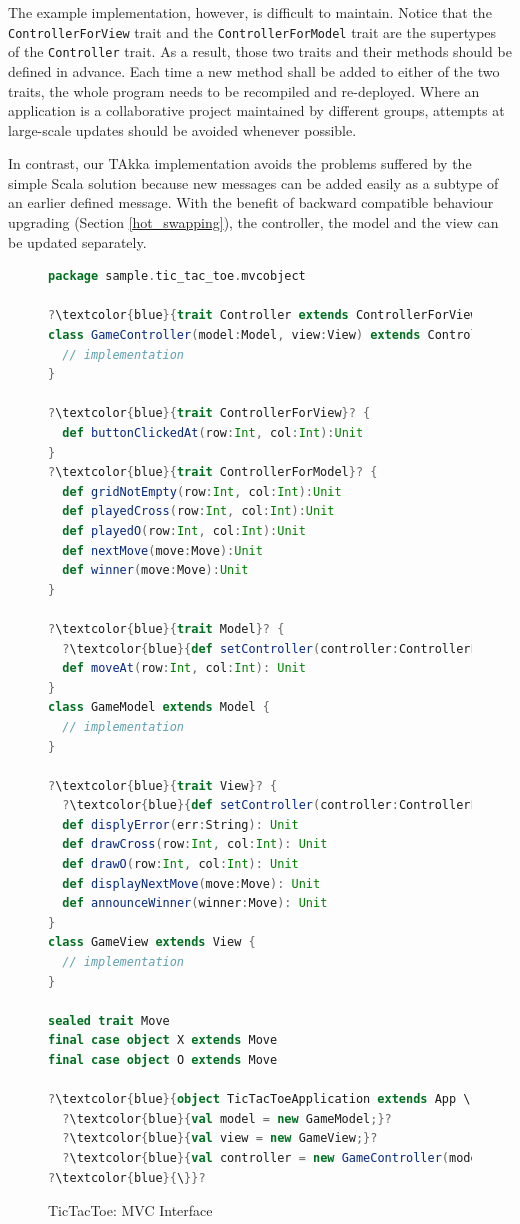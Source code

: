 The example implementation, however, is difficult to maintain.  Notice that the 
{\tt ControllerForView} trait and the {\tt ControllerForModel} trait are the 
supertypes of the {\tt Controller} trait.  As a result, those two traits 
and their methods should be defined in advance.  Each time a new 
method shall be added to either of the two traits, 
the whole program needs to be recompiled and re-deployed.  Where an application 
is a collaborative project maintained by different groups, attempts at 
large-scale updates should be avoided whenever possible.  

In contrast, our TAkka implementation avoids the problems suffered by the simple
Scala solution because new messages can be added easily as a subtype
of an earlier defined message.   With the benefit of backward compatible behaviour upgrading (Section 
\ref{hot_swapping}), the controller, the model and the view can be updated 
separately.




\begin{figure}[p]
\begin{lstlisting}[language=scala, escapechar=?]
package sample.tic_tac_toe.mvcobject

?\textcolor{blue}{trait Controller extends ControllerForView with ControllerForModel}?
class GameController(model:Model, view:View) extends Controller {
  // implementation
}

?\textcolor{blue}{trait ControllerForView}? {
  def buttonClickedAt(row:Int, col:Int):Unit
}
?\textcolor{blue}{trait ControllerForModel}? {
  def gridNotEmpty(row:Int, col:Int):Unit
  def playedCross(row:Int, col:Int):Unit
  def playedO(row:Int, col:Int):Unit
  def nextMove(move:Move):Unit
  def winner(move:Move):Unit
}

?\textcolor{blue}{trait Model}? {
  ?\textcolor{blue}{def setController(controller:ControllerForModel): Unit}?
  def moveAt(row:Int, col:Int): Unit
}
class GameModel extends Model {
  // implementation
}

?\textcolor{blue}{trait View}? {
  ?\textcolor{blue}{def setController(controller:ControllerForView): Unit}?
  def displyError(err:String): Unit
  def drawCross(row:Int, col:Int): Unit
  def drawO(row:Int, col:Int): Unit
  def displayNextMove(move:Move): Unit
  def announceWinner(winner:Move): Unit
}
class GameView extends View {
  // implementation
}

sealed trait Move
final case object X extends Move
final case object O extends Move

?\textcolor{blue}{object TicTacToeApplication extends App \{}?
  ?\textcolor{blue}{val model = new GameModel;}?
  ?\textcolor{blue}{val view = new GameView;}?
  ?\textcolor{blue}{val controller = new GameController(model, view)  }?
?\textcolor{blue}{\}}?
\end{lstlisting}
\caption{TicTacToe: MVC Interface}
\label{TTT_interface}
\end{figure}


